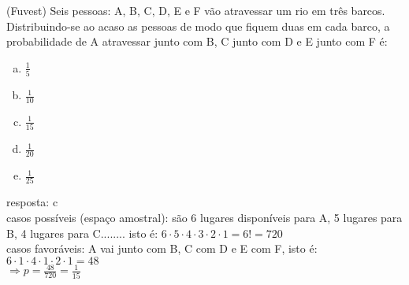 \begin{ex}
(Fuvest) Seis pessoas: A, B, C, D, E e F vão atravessar um rio em três barcos. Distribuindo-se ao acaso as pessoas de modo que fiquem duas em cada barco, a probabilidade de A atravessar junto com B, C junto com D e E junto com F é:
   \begin{enumerate}[(a)]
   \item $\frac{1}{5}$
   \item $\frac{1}{10}$
   \item $\frac{1}{15}$
   \item $\frac{1}{20}$
   \item $\frac{1}{25}$
   \end{enumerate}
    \begin{sol}
      resposta: c \\
    casos possíveis (espaço amostral): são 6 lugares disponíveis para A, 5 lugares para B, 4 lugares para C........ isto é: $6\cdot5\cdot4\cdot3\cdot2\cdot1=6!=720$\\
    casos favoráveis: A vai junto com B, C  com D e E com F, isto é: $6\cdot1\cdot4\cdot1\cdot2\cdot1=48$\\
    $\Longrightarrow p=\frac{48}{720}=\frac{1}{15}$
    \end{sol}
\end{ex}